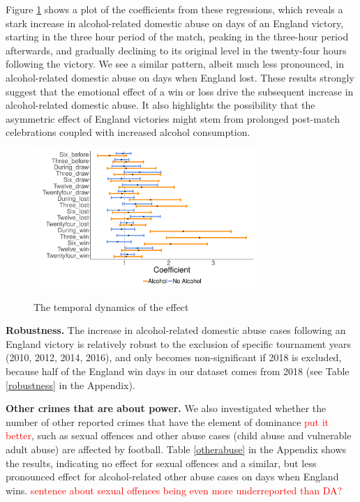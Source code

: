 \documentclass[12pt, letterpaper]{article}
\begin{document}
Figure \ref{fig:threehours} shows a plot of the coefficients from these regressions, which reveals a stark increase in alcohol-related domestic abuse on days of an England victory, starting in the three hour period of the match, peaking in the three-hour period afterwards, and gradually declining to its original level in the twenty-four hours following the victory. We see a similar pattern, albeit much less pronounced, in alcohol-related domestic abuse on days when England lost. These results strongly suggest that the emotional effect of a win or loss drive the subsequent increase in alcohol-related domestic abuse. It also highlights the possibility that the asymmetric effect of England victories might stem from prolonged post-match celebrations coupled with increased alcohol consumption.


\begin{figure}
\centering
 \caption{The temporal dynamics of the effect}
\includegraphics[width=0.75\textwidth]{Threehours.pdf}
\label{fig:threehours}
\end{figure}

\newpage


\textbf{Robustness.} The increase in alcohol-related domestic abuse cases following an England victory is relatively robust to the exclusion of specific tournament years (2010, 2012, 2014, 2016), and only becomes non-significant if 2018 is excluded, because half of the England win days in our dataset comes from 2018 (see Table \ref{robustness} in the Appendix). 

\textbf{Other crimes that are about power.} We also investigated whether the number of other reported crimes that have the element of dominance \textcolor{red}{put it better}, such as sexual offences and other abuse cases (child abuse and vulnerable adult abuse) are affected by football. Table \ref{otherabuse} in the Appendix shows the results, indicating no effect for sexual offences and a similar, but less pronounced effect for alcohol-related other abuse cases on days when England wins. \textcolor{red}{sentence about sexual offences being even more underreported than DA?}
\end{document}
